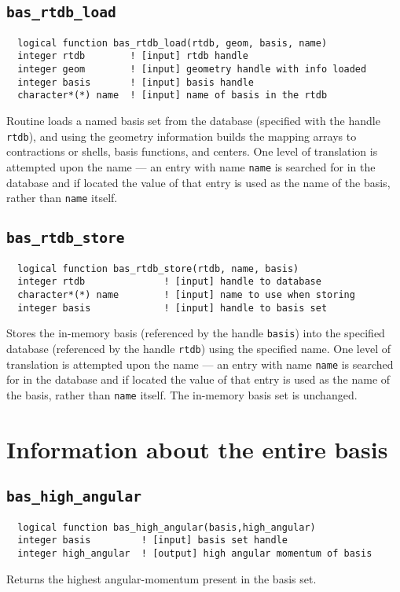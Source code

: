 \subsection{{\tt bas\_rtdb\_load}}
\begin{verbatim}
  logical function bas_rtdb_load(rtdb, geom, basis, name)
  integer rtdb        ! [input] rtdb handle      
  integer geom        ! [input] geometry handle with info loaded
  integer basis       ! [input] basis handle
  character*(*) name  ! [input] name of basis in the rtdb
\end{verbatim}
Routine loads a named basis set from the database (specified with the
handle {\tt rtdb}), and using the geometry information builds the
mapping arrays to contractions or shells, basis functions, and
centers.  One level of translation is attempted upon the name --- an
entry with name {\tt name} is searched for in the database and if
located the value of that entry is used as the name of the basis,
rather than {\tt name} itself.

\subsection{{\tt bas\_rtdb\_store}}
\begin{verbatim}
  logical function bas_rtdb_store(rtdb, name, basis)
  integer rtdb              ! [input] handle to database
  character*(*) name        ! [input] name to use when storing
  integer basis             ! [input] handle to basis set
\end{verbatim}
Stores the in-memory basis (referenced by the handle {\tt basis}) into
the specified database (referenced by the handle {\tt rtdb}) using the
specified name.  One level of translation is attempted upon the name
--- an entry with name {\tt name} is searched for in the database and
if located the value of that entry is used as the name of the basis,
rather than {\tt name} itself.  The in-memory basis set is unchanged.

\section{Information about the entire basis}

\subsection{{\tt bas\_high\_angular}}
\begin{verbatim}
  logical function bas_high_angular(basis,high_angular)
  integer basis         ! [input] basis set handle
  integer high_angular  ! [output] high angular momentum of basis
\end{verbatim}
Returns the highest angular-momentum present in the basis set.

